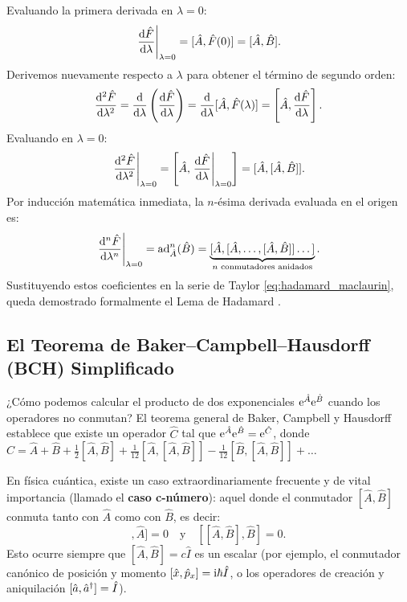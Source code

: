 Evaluando la primera derivada en $\lambda = 0$:
\begin{equation}
    \left.\frac{\mathrm{d}\hat{F}}{\mathrm{d} \lambda}\right|_{\lambda=0} = [\hat{A}, \hat{F}(0)] = [\hat{A}, \hat{B}].
\end{equation}
Derivemos nuevamente respecto a $\lambda$ para obtener el término de segundo orden:
\begin{equation}
    \frac{\mathrm{d}^2\hat{F}}{\mathrm{d} \lambda^2} = \frac{\mathrm{d}}{\mathrm{d} \lambda}\left( \frac{\mathrm{d}\hat{F}}{\mathrm{d} \lambda} \right) = \frac{\mathrm{d}}{\mathrm{d} \lambda}[\hat{A}, \hat{F}(\lambda)] = \left[\hat{A}, \frac{\mathrm{d}\hat{F}}{\mathrm{d} \lambda}\right].
\end{equation}
Evaluando en $\lambda = 0$:
\begin{equation}
    \left.\frac{\mathrm{d}^2\hat{F}}{\mathrm{d} \lambda^2}\right|_{\lambda=0} = \left[\hat{A}, \left.\frac{\mathrm{d}\hat{F}}{\mathrm{d} \lambda}\right|_{\lambda=0}\right] = [\hat{A}, [\hat{A}, \hat{B}]].
\end{equation}
Por inducción matemática inmediata, la $n$-ésima derivada evaluada en el origen es:
\begin{equation}
    \left.\frac{\mathrm{d}^n\hat{F}}{\mathrm{d} \lambda^n}\right|_{\lambda=0} = \mathrm{ad}_{\hat{A}}^n(\hat{B}) = \underbrace{[\hat{A}, [\hat{A}, \dots, [\hat{A}, \hat{B}]] \dots ]}_{n \text{ conmutadores anidados}}.
\end{equation}
Sustituyendo estos coeficientes en la serie de Taylor \eqref{eq:hadamard_maclaurin}, queda demostrado formalmente el Lema de Hadamard \cite{zettili}.

\subsection{El Teorema de Baker--Campbell--Hausdorff (BCH) Simplificado}

¿Cómo podemos calcular el producto de dos exponenciales $\mathrm{e}^{\hat{A}}\mathrm{e}^{\hat{B}}$ cuando los operadores no conmutan? El teorema general de Baker, Campbell y Hausdorff establece que existe un operador $\hat{C}$ tal que $\mathrm{e}^{\hat{A}}\mathrm{e}^{\hat{B}} = \mathrm{e}^{\hat{C}}$, donde $\hat{C} = \hat{A} + \hat{B} + \frac{1}{2}[\hat{A}, \hat{B}] + \frac{1}{12}[\hat{A}, [\hat{A}, \hat{B}]] - \frac{1}{12}[\hat{B}, [\hat{A}, \hat{B}]] + \dots$

En física cuántica, existe un caso extraordinariamente frecuente y de vital importancia (llamado el \textbf{caso c-número}): aquel donde el conmutador $[\hat{A}, \hat{B}]$ conmuta tanto con $\hat{A}$ como con $\hat{B}$, es decir:
\begin{equation}
    [[\hat{A}, \hat{B}], \hat{A}] = 0 \quad \text{y} \quad [[\hat{A}, \hat{B}], \hat{B}] = 0.
    \label{eq:bch_hypothesis}
\end{equation}
Esto ocurre siempre que $[\hat{A}, \hat{B}] = c\hat{I}$ es un escalar (por ejemplo, el conmutador canónico de posición y momento $[\hat{x}, \hat{p}_x] = \mathrm{i}\hbar\hat{I}$, o los operadores de creación y aniquilación $[\hat{a}, \hat{a}^\dagger] = \hat{I}$).

